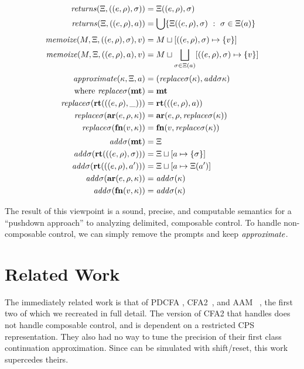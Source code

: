 \documentclass{llncs}
\newcommand{\Scribtexttt}[1]{{\texttt{#1}}}
\newcommand{\SColorize}[2]{\color{#1}{#2}}
\newcommand{\inColor}[2]{{\Scribtexttt{\SColorize{#1}{#2}}}}
\newcommand{\rackett}[1]{\inColor{black}{#1}}
\begin{document}
\newcommand{\replacectx}{\mathit{replace}\mstore}
\newcommand{\addstore}{\mathit{add}\mstore}
\begin{align*}
  \returns(\mktab, ((\mexpr,\menv), \mstore)) &= \mktab((\mexpr,\menv), \mstore) \\
  \returns(\mktab, ((\mexpr,\menv), \maddr)) &=
    \bigcup\setbuild{\mktab((\mexpr,\menv),\mstore)}{\mstore \in \mktab(\maddr)}
  \\[2pt]
  \memoize(\mmemo, \mktab, ((\mexpr,\menv), \mstore), \mval) &=
    \joinone{\mmemo}{((\mexpr,\menv), \mstore)}{\mval} \\
  \memoize(\mmemo, \mktab, ((\mexpr,\menv), \maddr), \mval) &=
    \mmemo \sqcup \bigsqcup\limits_{\mstore \in \mktab(\maddr)}\snglm{((\mexpr,\menv), \mstore)}{\mval}
  \\[2pt]
  \approximate(\mkont, \mktab, \maddr) &= (\replacectx(\mkont), \addstore{\mkont}) \\
  \text{where }
   \replacectx(\kmt) &= \kmt \\
   \replacectx(\krt{((\mexpr,\menv),\_)}) &= \krt{((\mexpr,\menv),\maddr)} \\
   \replacectx(\kar{\mexpr,\menv,\mkont}) &= \kar{\mexpr,\menv,\replacectx(\mkont)} \\
   \replacectx(\kfn{\mval, \mkont}) &= \kfn{\mval,\replacectx(\mkont)}
  \\[2pt]
   \addstore(\kmt) &= \mktab \\
   \addstore(\krt{((\mexpr,\menv),\mstore)}) &= \joinone{\mktab}{\maddr}{\mstore} \\
   \addstore(\krt{((\mexpr,\menv),\maddr')}) &= \joinm{\mktab}{\maddr}{\mktab(\maddr')} \\
   \addstore(\kar{\mexpr,\menv,\mkont}) &= \addstore(\mkont) \\
   \addstore(\kfn{\mval, \mkont}) &= \addstore(\mkont)
\end{align*}

The result of this viewpoint is a sound, precise, and computable
semantics for a ``pushdown approach'' to analyzing delimited,
composable control. To handle non-composable control, we can simply
remove the prompts and keep $\mathit{approximate}$.

\section{Related Work}

The immediately related work is that of PDCFA
\citep{ianjohnson:earl2010pdcfa},
CFA2~\citep{ianjohnson:vardoulakis-lmcs11,
  ianjohnson:Vardoulakis2011Pushdown}, and AAM
~\citep{dvanhorn:VanHorn2010Abstracting}, the first two of which we
recreated in full detail. The version of CFA2 that handles
\rackett{call/cc} does not handle composable control, and is dependent
on a restricted CPS representation. They also had no way to tune the
precision of their first class continuation approximation. Since
\rackett{call/cc} can be simulated with shift/reset, this work
supercedes theirs.
\end{document}
